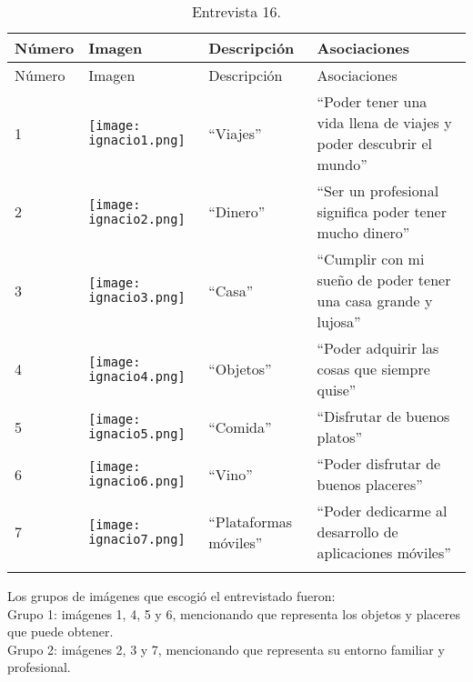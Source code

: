 \begin{longtable}{>{\centering\arraybackslash}m{1cm} >{\centering\arraybackslash}m{2cm} >{\arraybackslash}m{5cm}>{\arraybackslash}m{5cm}}
	
	\hline
	Número & Imagen & Descripción & Asociaciones \\
	\hline \hline
	\endfirsthead
	
	\hline
	Número & Imagen & Descripción & Asociaciones \\
	\hline \hline
	\endhead

1 & \texttt{[image: ignacio1.png]} & ``Viajes'' & ``Poder tener una vida llena de viajes y poder descubrir el mundo'' \\
\hline

2 & \texttt{[image: ignacio2.png]} & ``Dinero'' & ``Ser un profesional significa poder tener mucho dinero'' \\
\hline

3 & \texttt{[image: ignacio3.png]} & ``Casa'' & ``Cumplir con mi sueño de poder tener una casa grande y lujosa'' \\
\hline

4 & \texttt{[image: ignacio4.png]} & ``Objetos'' & ``Poder adquirir las cosas que siempre quise'' \\
\hline

5 & \texttt{[image: ignacio5.png]} & ``Comida'' & ``Disfrutar de buenos platos'' \\
\hline

6 & \texttt{[image: ignacio6.png]} & ``Vino'' & ``Poder disfrutar de buenos placeres'' \\
\hline

7 & \texttt{[image: ignacio7.png]} & ``Plataformas móviles'' & ``Poder dedicarme al desarrollo de aplicaciones móviles'' \\
\hline

\caption{Entrevista 16.}
\label{tabla:ignacio}
\end{longtable}

Los grupos de imágenes que escogió el entrevistado fueron:\\

Grupo 1: imágenes 1, 4, 5 y 6, mencionando que representa los objetos y placeres que puede obtener. \\

Grupo 2: imágenes 2, 3 y 7, mencionando que representa su entorno familiar y profesional.\\


